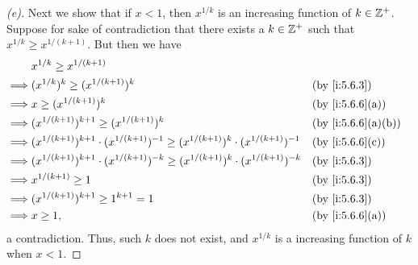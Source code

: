 \begin{proof}[(e)]
  Next we show that if \(x < 1\), then \(x^{1 / k}\) is an increasing function of \(k \in \mathbb{Z}^+\).
  Suppose for sake of contradiction that there exists a \(k \in \mathbb{Z}^+\) such that \(x^{1 / k} \geq x^{1 / (k + 1)}\).
  But then we have
  \begin{align*}
             & x^{1 / k} \geq x^{1 / (k + 1)}                                                                                                      \\
    \implies & (x^{1 / k})^k \geq (x^{1 / (k + 1)})^k                                                                       &  & \by{i:5.6.3}      \\
    \implies & x \geq (x^{1 / (k + 1)})^k                                                                                   &  & \by{i:5.6.6}[a]   \\
    \implies & (x^{1 / (k + 1)})^{k + 1} \geq (x^{1 / (k + 1)})^k                                                           &  & \by{i:5.6.6}[a,b] \\
    \implies & (x^{1 / (k + 1)})^{k + 1} \cdot (x^{1 / (k + 1)})^{-1} \geq (x^{1 / (k + 1)})^k \cdot (x^{1 / (k + 1)})^{-1} &  & \by{i:5.6.6}[c]   \\
    \implies & (x^{1 / (k + 1)})^{k + 1} \cdot (x^{1 / (k + 1)})^{-k} \geq (x^{1 / (k + 1)})^k \cdot (x^{1 / (k + 1)})^{-k} &  & \by{i:5.6.3}      \\
    \implies & x^{1 / (k + 1)} \geq 1                                                                                       &  & \by{i:5.6.3}      \\
    \implies & (x^{1 / (k + 1)})^{k + 1} \geq 1^{k + 1} = 1                                                                 &  & \by{i:5.6.3}      \\
    \implies & x \geq 1,                                                                                                    &  & \by{i:5.6.6}[a]
  \end{align*}
  a contradiction.
  Thus, such \(k\) does not exist, and \(x^{1 / k}\) is a increasing function of \(k\) when \(x < 1\).


\end{proof}
